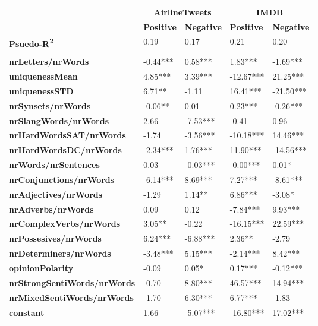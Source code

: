 \begin{tabular}{|l|l|l|l|l|} \cline{2-5}
\multicolumn{1}{c|}{} & \multicolumn{2}{c|}{\textbf{AirlineTweets}} & \multicolumn{2}{c|}{\textbf{IMDB}}\\ \cline{2-5}
\multicolumn{1}{c|}{} & \textbf{Positive} & \textbf{Negative} & \textbf{Positive} & \textbf{Negative} \\ \hline
\textbf{Psuedo-R\textsuperscript{2}} & 0.19 & 0.17 & 0.21 & 0.20\\ \hline
 \multicolumn{3}{c}{} \\ [-1.5ex] \hline
\textbf{nrLetters/nrWords} & -0.44*** & \phantom{-}0.58*** & \phantom{-}1.83*** & -1.69*** \\ \hline
\textbf{uniquenessMean} & \phantom{-}4.85*** & \phantom{-}3.39*** & -12.67*** & \phantom{-}21.25*** \\ \hline
\textbf{uniquenessSTD} & \phantom{-}6.71** & -1.11 & \phantom{-}16.41*** & -21.50*** \\ \hline
\textbf{nrSynsets/nrWords} & -0.06** & \phantom{-}0.01 & \phantom{-}0.23*** & -0.26*** \\ \hline
\textbf{nrSlangWords/nrWords} & \phantom{-}2.66 & -7.53*** & -0.41 & \phantom{-}0.96 \\ \hline
\textbf{nrHardWordsSAT/nrWords} & -1.74 & -3.56*** & -10.18*** & \phantom{-}14.46*** \\ \hline
\textbf{nrHardWordsDC/nrWords} & -2.34*** & \phantom{-}1.76*** & \phantom{-}11.90*** & -14.56*** \\ \hline
\textbf{nrWords/nrSentences} & \phantom{-}0.03 & -0.03*** & -0.00*** & \phantom{-}0.01* \\ \hline
\textbf{nrConjunctions/nrWords} & -6.14*** & \phantom{-}8.69*** & \phantom{-}7.27*** & -8.61*** \\ \hline
\textbf{nrAdjectives/nrWords} & -1.29 & \phantom{-}1.14** & \phantom{-}6.86*** & -3.08* \\ \hline
\textbf{nrAdverbs/nrWords} & \phantom{-}0.09 & \phantom{-}0.12 & -7.84*** & \phantom{-}9.93*** \\ \hline
\textbf{nrComplexVerbs/nrWords} & \phantom{-}3.05** & -0.22 & -16.15*** & \phantom{-}22.59*** \\ \hline
\textbf{nrPossesives/nrWords} & \phantom{-}6.24*** & -6.88*** & \phantom{-}2.36** & -2.79 \\ \hline
\textbf{nrDeterminers/nrWords} & -3.48*** & \phantom{-}5.15*** & -2.14*** & \phantom{-}8.42*** \\ \hline
\textbf{opinionPolarity} & -0.09 & \phantom{-}0.05* & \phantom{-}0.17*** & -0.12*** \\ \hline
\textbf{nrStrongSentiWords/nrWords} & -0.70 & \phantom{-}8.80*** & \phantom{-}46.57*** & \phantom{-}14.94*** \\ \hline
\textbf{nrMixedSentiWords/nrWords} & -1.70 & \phantom{-}6.30*** & \phantom{-}6.77*** & -1.83 \\ \hline
\textbf{constant} & \phantom{-}1.66 & -5.07*** & -16.80*** & \phantom{-}17.02*** \\ \hline
\end{tabular}
